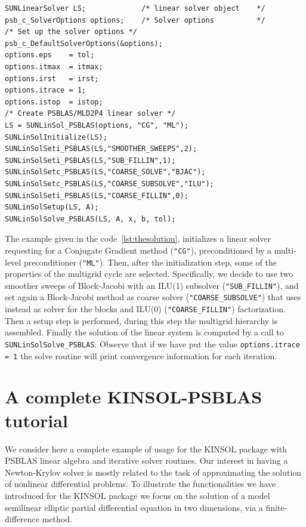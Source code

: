 \documentclass[twoside,a4paper]{refart}
\theoremstyle{definition}
\begin{document}
\begin{lstlisting}[style=CStyle,caption="An example of solution with PCG preconditioned by a ML preconditioner",label=lst:thesolution]
SUNLinearSolver LS;             /* linear solver object    */
psb_c_SolverOptions options;    /* Solver options          */
/* Set up the solver options */
psb_c_DefaultSolverOptions(&options);
options.eps    = tol;
options.itmax  = itmax;
options.irst   = irst;
options.itrace = 1;
options.istop  = istop;
/* Create PSBLAS/MLD2P4 linear solver */
LS = SUNLinSol_PSBLAS(options, "CG", "ML");
SUNLinSolInitialize(LS);
SUNLinSolSeti_PSBLAS(LS,"SMOOTHER_SWEEPS",2);
SUNLinSolSeti_PSBLAS(LS,"SUB_FILLIN",1);
SUNLinSolSetc_PSBLAS(LS,"COARSE_SOLVE","BJAC");
SUNLinSolSetc_PSBLAS(LS,"COARSE_SUBSOLVE","ILU");
SUNLinSolSeti_PSBLAS(LS,"COARSE_FILLIN",0);
SUNLinSolSetup(LS, A);
SUNLinSolSolve_PSBLAS(LS, A, x, b, tol);
\end{lstlisting}

The example given in the code~\ref{lst:thesolution}, initializes a linear solver requesting for a Conjugate Gradient method (\lstinline[style=CStyle]|"CG"|), preconditioned by a multi-level preconditioner (\lstinline[style=CStyle]|"ML"|). Then, after the initialization step, some of the properties of the multigrid cycle are selected. Specifically, we decide to use two smoother sweeps of Block-Jacobi with an ILU(1) subsolver (\lstinline[style=CStyle]|"SUB_FILLIN"|), and set again a Block-Jacobi method as coarse solver (\lstinline[style=CStyle]|"COARSE_SUBSOLVE"|) that uses instead as solver for the blocks and ILU(0) (\lstinline[style=CStyle]|"COARSE_FILLIN"|) factorization. Then a setup step is performed, during this step the multigrid hierarchy is assembled. Finally the solution of the linear system is computed by a call to \lstinline[style=CStyle]|SUNLinSolSolve_PSBLAS|. Observe that if we have put the value \lstinline[style=CStyle]|options.itrace = 1| the solve routine will print convergence information for each iteration.

\section{A complete KINSOL-PSBLAS tutorial}

We consider here a complete example of usage for the KINSOL package with PSBLAS linear algebra and iterative solver routines. Our interest in having a Newton-Krylov solver is mostly related to the task of approximating the solution of nonlinear differential problems. To illustrate the functionalities we have introduced for the KINSOL package we focus on the solution of a model semilinear elliptic partial differential equation in two dimensions, via a finite-difference method.
\end{document}
